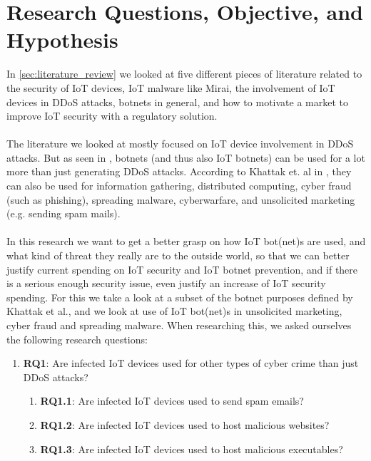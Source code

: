 \documentclass[a4paper,10pt]{article}
\begin{document}
\section{Research Questions, Objective, and Hypothesis} \label{sec:research_questions}
% 
In \autoref{sec:literature_review} we looked at five different pieces of literature related to the security of IoT 
devices, IoT malware like Mirai, the involvement of IoT devices in DDoS attacks, botnets in general, and how 
to motivate a market to improve IoT security with a regulatory solution.
\\\\
The literature we looked at mostly focused on IoT device involvement in DDoS attacks. But as seen in \cite{Khattak2014},
botnets (and thus also IoT botnets) can be used for a lot more than just generating DDoS attacks. According to Khattak et. al
in \cite{Khattak2014}, they can also be used for information gathering, distributed computing, cyber fraud (such as phishing),
spreading malware, cyberwarfare, and unsolicited marketing (e.g. sending spam mails).
\\\\
In this research we want to get a better grasp on how IoT bot(net)s are used, and what kind of threat they really are to the 
outside world, so that we can better justify current spending on IoT security and IoT botnet prevention, and if there is a
serious enough security issue, even
justify an increase of IoT security spending. For this we take a look at a subset of the botnet purposes defined by Khattak et al., and
we look at use of IoT bot(net)s in unsolicited marketing, cyber fraud and spreading malware. When researching this, we 
asked ourselves the following research questions:
\begin{enumerate}
 \item[] \textbf{RQ1}: Are infected IoT devices used for other types of cyber crime than just DDoS attacks? \label{rq1}
 \begin{enumerate}
  \item[] \textbf{RQ1.1}: Are infected IoT devices used to send spam emails? \label{rq11}
  \item[] \textbf{RQ1.2}: Are infected IoT devices used to host malicious websites? \label{rq12}
  \item[] \textbf{RQ1.3}: Are infected IoT devices used to host malicious executables? \label{rq13}
 \end{enumerate}
\end{enumerate}
\end{document}
